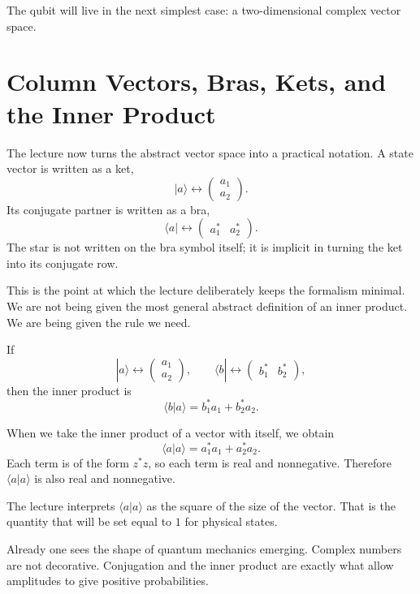 The qubit will live in the next simplest case: a two-dimensional complex vector space.

\section{Column Vectors, Bras, Kets, and the Inner Product}

The lecture now turns the abstract vector space into a practical notation. A state vector is written as a ket,
\[
|a\rangle \leftrightarrow \begin{pmatrix}a_1\\a_2\end{pmatrix}.
\]
Its conjugate partner is written as a bra,
\[
\langle a| \leftrightarrow \begin{pmatrix}a_1^* & a_2^*\end{pmatrix}.
\]
The star is not written on the bra symbol itself; it is implicit in turning the ket into its conjugate row.

This is the point at which the lecture deliberately keeps the formalism minimal. We are not being given the most general abstract definition of an inner product. We are being given the rule we need.

If
\[
|a\rangle \leftrightarrow \begin{pmatrix}a_1\\a_2\end{pmatrix},
\qquad
\langle b| \leftrightarrow \begin{pmatrix}b_1^* & b_2^*\end{pmatrix},
\]
then the inner product is
\begin{equation}
\langle b|a\rangle = b_1^*a_1+b_2^*a_2.
\end{equation}

When we take the inner product of a vector with itself, we obtain
\begin{equation}
\langle a|a\rangle = a_1^*a_1+a_2^*a_2.
\end{equation}
Each term is of the form \(z^*z\), so each term is real and nonnegative. Therefore \(\langle a|a\rangle\) is also real and nonnegative.

\begin{remark}
The lecture interprets \(\langle a|a\rangle\) as the square of the size of the vector. That is the quantity that will be set equal to \(1\) for physical states.
\end{remark}

Already one sees the shape of quantum mechanics emerging. Complex numbers are not decorative. Conjugation and the inner product are exactly what allow amplitudes to give positive probabilities.

